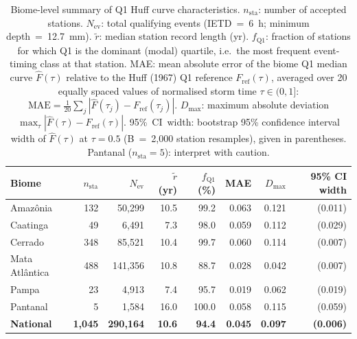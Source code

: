 \documentclass[a4paper,fleqn]{cas-sc}
\begin{document}
\begin{table}[!t]
  \centering
  \caption{Biome-level summary of Q1 Huff curve characteristics.
    $n_\mathrm{sta}$: number of accepted stations.
    $N_\mathrm{ev}$: total qualifying events (IETD~=~6~h;
    minimum depth~=~12.7~mm).
    $\tilde{r}$: median station record length (yr).
    $f_\mathrm{Q1}$: fraction of stations for which Q1 is
    the dominant (modal) quartile, i.e.\ the most frequent
    event-timing class at that station.
    MAE: mean absolute error of the biome Q1 median curve
    $\hat{F}(\tau)$ relative to the Huff (1967) Q1 reference
    $F_\mathrm{ref}(\tau)$, averaged over 20 equally spaced values
    of normalised storm time $\tau \in (0, 1]$:
    $\mathrm{MAE} = \tfrac{1}{20}\sum_{j}|\hat{F}(\tau_j)
    - F_\mathrm{ref}(\tau_j)|$.
    $D_\mathrm{max}$: maximum absolute deviation
    $\max_\tau|\hat{F}(\tau) - F_\mathrm{ref}(\tau)|$.
    95\%~CI~width: bootstrap 95\% confidence interval width of
    $\hat{F}(\tau)$ at $\tau = 0.5$ (B~=~2{,}000 station resamples),
    given in parentheses.
    Pantanal ($n_\mathrm{sta}=5$): interpret with caution.}
  \label{tab:biome}
  \setlength{\tabcolsep}{4pt}
  \begin{tabular}{lrrrrrrr}
    \toprule
    Biome & $n_\mathrm{sta}$ & $N_\mathrm{ev}$ & $\tilde{r}$ (yr) &
      $f_\mathrm{Q1}$ (\%) & MAE & $D_\mathrm{max}$ &
      95\% CI width \\
    \midrule
    Amazônia        & 132 & 50{,}299 & 10.5 & 99.2 & 0.063 & 0.121 & (0.011) \\
    Caatinga        &  49 &  6{,}491 &  7.3 & 98.0 & 0.059 & 0.112 & (0.029) \\
    Cerrado         & 348 & 85{,}521 & 10.4 & 99.7 & 0.060 & 0.114 & (0.007) \\
    Mata Atlântica  & 488 &141{,}356 & 10.8 & 88.7 & 0.028 & 0.042 & (0.007) \\
    Pampa           &  23 &  4{,}913 &  7.4 & 95.7 & 0.019 & 0.062 & (0.019) \\
    Pantanal        &   5 &  1{,}584 & 16.0 & 100.0 & 0.058 & 0.115 & (0.059) \\
    \midrule
    \textbf{National} & \textbf{1{,}045} & \textbf{290{,}164} &
      \textbf{10.6} & \textbf{94.4} & \textbf{0.045} &
      \textbf{0.097} & \textbf{(0.006)} \\
    \bottomrule
  \end{tabular}
\end{table}
\end{document}
